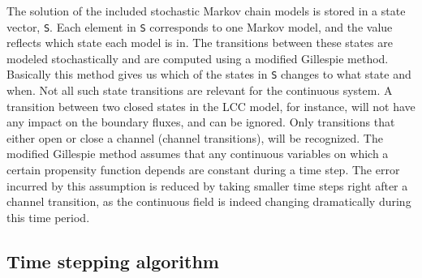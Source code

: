 The solution of the included stochastic Markov chain models is stored
in a state vector, \texttt{S}. Each element in \texttt{S} corresponds
to one Markov model, and the value reflects which state each model is
in. The transitions between these states are modeled stochastically
and are computed using a modified Gillespie method. Basically this
method gives us which of the states in \texttt{S} changes to what
state and when. Not all such state transitions are relevant for the
continuous system. A transition between two closed states in the LCC
model, for instance, will not have any impact on the boundary fluxes,
and can be ignored. Only transitions that either open or close a
channel (channel transitions), will be recognized. The modified
Gillespie method assumes that any continuous variables on which a
certain propensity function depends are constant during a time
step. The error incurred by this assumption is reduced by taking
smaller time steps right after a channel transition, as the continuous
field is indeed changing dramatically during this time period.

\subsection{Time stepping algorithm}

